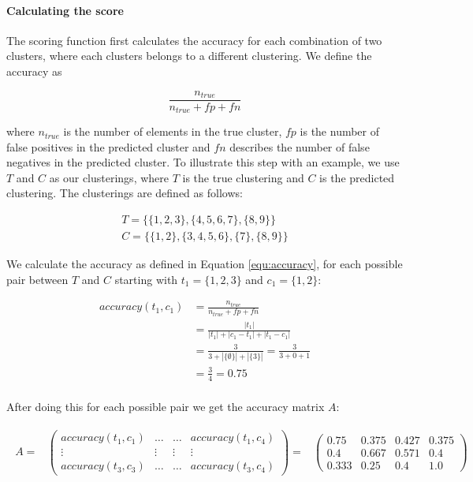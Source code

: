 \paragraph{Calculating the score}

The scoring function first calculates the accuracy for each combination of two clusters, where each clusters belongs to a different clustering. We define the accuracy as

\begin{equation}
    \label{equ:accuracy}
    \frac{n_{true}}{n_{true} + fp + fn}
\end{equation}

where $n_{true}$ is the number of elements in the true cluster, $fp$ is the number of false positives in the predicted cluster and $fn$ describes the number of false negatives in the predicted cluster. To illustrate this step with an example, we use $T$ and $C$ as our clusterings, where $T$ is the true clustering and $C$ is the predicted clustering. The clusterings are defined as follows:

\begin{gather*}
    T = \{\{1,2,3\},\{4,5,6,7\},\{8,9\}\} \\
    C = \{\{1,2\},\{3,4,5,6\},\{7\},\{8,9\}\}
\end{gather*}

We calculate the accuracy as defined in Equation \ref{equ:accuracy}, for each possible pair between $T$ and $C$ starting with $t_1= \{1,2,3\}$ and $c_1 = \{1,2\}$:

\begin{align*}
    accuracy(t_1,c_1) &= \frac{n_{true}}{n_{true} + fp + fn} \\
    &= \frac{|t_1|}{|t_1| + |c_1 - t_1| + |t_1 - c_1|} \\
    &= \frac{3}{ 3 + |\{\emptyset\}| + |\{3\}|} = \frac{3}{ 3 + 0 + 1} \\
    &= \frac{3}{4} = 0.75 \\
\end{align*}

After doing this for each possible pair we get the accuracy matrix $A$:

\begin{gather*}
\begin{array}{rcl}
    A = & \left(\begin{array}{cccc}
        accuracy(t_1,c_1) & \hdots & \hdots & accuracy(t_1,c_4)\\
        \vdots & \vdots & \vdots & \vdots\\
        accuracy(t_3,c_3) & \hdots & \hdots & accuracy(t_3,c_4) \end{array}\right)
        = & \left(\begin{array}{cccc}
            0.75 & 0.375 & 0.427 & 0.375 \\
            0.4 & 0.667 & 0.571 & 0.4 \\
            0.333 &  0.25 & 0.4 & 1.0 \end{array}\right)
\end{array}
\end{gather*}

